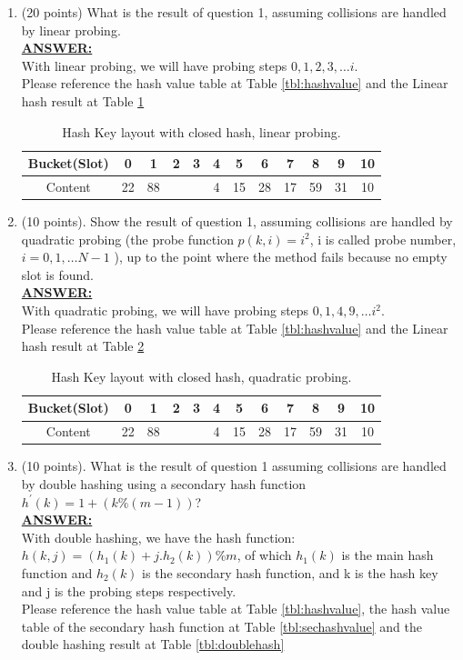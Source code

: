 \documentclass{article}
\newcommand{\answer}{\textbf{\\\underline{ANSWER:}\\}}
\begin{document}
\begin{enumerate}
\item(20 points) What is the result of question 1, assuming collisions
  are handled by linear probing.
\answer With linear probing, we will have probing steps $0, 1, 2, 3,
\ldots i$. \\
Please reference the hash value table at Table
\ref{tbl:hashvalue} and the Linear hash result at Table
\ref{tbl:linearhash} 

\begin{table}[H]
  \begin{center}
    \begin{tabular}{|c|c|c|c|c|c|c|c|c|c|c|c|} 
      \hline Bucket(Slot)&0&1&2&3&4&5&6&7&8&9&10 \\
      \hline 
      Content &22&88& & &4&15&28&17&59&31&10 \\
      \hline
    \end{tabular}
    \caption{Hash Key layout with closed hash, linear
      probing. \label{tbl:linearhash}}
    \vspace{-15pt}
  \end{center}
\end{table}

\item(10 points). Show the result of question 1, assuming collisions
  are handled by quadratic probing (the probe function $p(k,i) = i^2$,
  i is called probe number, $i=0, 1,\ldots N-1$ ),  up to the point where
  the method fails because no empty slot is found. 
\answer With quadratic probing, we will have probing steps $0, 1, 4, 9,
\ldots i^2$. \\
Please reference the hash value table at Table
\ref{tbl:hashvalue} and the Linear hash result at Table \ref{tbl:quadhash}
\begin{table}[H]
  \begin{center}
    \begin{tabular}{|c|c|c|c|c|c|c|c|c|c|c|c|} 
      \hline Bucket(Slot)&0&1&2&3&4&5&6&7&8&9&10 \\
      \hline 
      Content &22&88& & &4&15&28&17&59&31&10 \\
      \hline
    \end{tabular}
    \caption{Hash Key layout with closed hash, quadratic
      probing. \label{tbl:quadhash}}
    \vspace{-15pt}
  \end{center}
\end{table}

\item(10 points). What is the result of question 1 assuming collisions
  are handled by double hashing using a secondary hash function 
  $h^\prime (k) = 1 + (k \% (m-1))$?
\answer With double hashing, we have the hash function:
$h(k,j)=(h_1(k)+j.h_2(k))\%m$, of which $h_1(k)$ is the main hash
function and $h_2(k)$ is the secondary hash function, and k is the
hash key and j is the probing steps respectively. \\
Please reference the hash value table at Table
\ref{tbl:hashvalue}, the hash value table of the secondary hash
function at Table \ref{tbl:sechashvalue} and the double hashing result at
Table \ref{tbl:doublehash} 


\end{enumerate}
\end{document}
